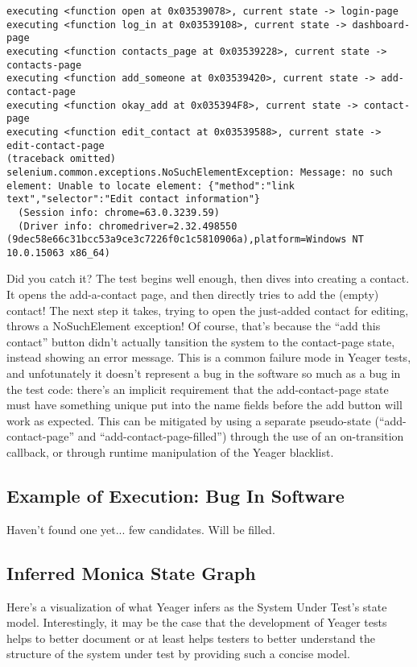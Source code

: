 \begin{Verbatim}[fontsize=\small]
executing <function open at 0x03539078>, current state -> login-page
executing <function log_in at 0x03539108>, current state -> dashboard-page
executing <function contacts_page at 0x03539228>, current state -> contacts-page
executing <function add_someone at 0x03539420>, current state -> add-contact-page
executing <function okay_add at 0x035394F8>, current state -> contact-page
executing <function edit_contact at 0x03539588>, current state -> edit-contact-page
(traceback omitted)
selenium.common.exceptions.NoSuchElementException: Message: no such element: Unable to locate element: {"method":"link text","selector":"Edit contact information"}
  (Session info: chrome=63.0.3239.59)
  (Driver info: chromedriver=2.32.498550 (9dec58e66c31bcc53a9ce3c7226f0c1c5810906a),platform=Windows NT 10.0.15063 x86_64)
\end{Verbatim}


Did you catch it? The test begins well enough, then dives into creating a contact. It opens the add-a-contact page, and then directly tries to add the (empty) contact! The next step it takes, trying to open the just-added contact for editing, throws a NoSuchElement exception! Of course, that's because the  ``add this contact'' button didn't actually tansition the system to the contact-page state, instead showing an error message. This is a common failure mode in Yeager tests, and unfotunately it doesn't represent a bug in the software so much as a bug in the test code: there's an implicit requirement that the add-contact-page state must have something unique put into the name fields before the add button will work as expected. This can be mitigated by using a separate pseudo-state (``add-contact-page'' and ``add-contact-page-filled'') through the use of an on-transition callback, or through runtime manipulation of the Yeager blacklist.

\subsection{Example of Execution: Bug In Software}
Haven't found one yet... few candidates. Will be filled.

\subsection{Inferred Monica State Graph}

Here's a visualization of what Yeager infers as the System Under Test's state model. Interestingly, it may be the case that the development of Yeager tests helps to better document or at least helps testers to better understand the structure of the system under test by providing such a concise model.


